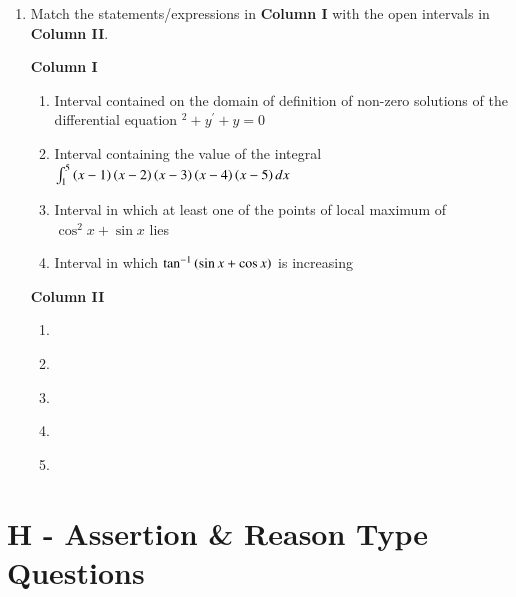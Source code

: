 \documentclass[journal]{IEEEtran}
\begin{document}
\begin{enumerate}

\item Match the statements/expressions in \textbf{Column I} with the open intervals in \textbf{Column II}.
	\hfill{}

	\begin{minipage}[t]{0.5\textwidth}
		\textbf{Column I}
		\begin{enumerate}[label=\brak{\Alph*}]
	\item Interval contained on the domain of definition of non-zero solutions of the differential equation $^2+y^{\prime}+y=0$
	\item Interval containing the value of the integral \\$\int_1^5 \left(x-1\right)\left(x-2\right)\left(x-3\right)\left(x-4\right)\left(x-5\right)dx$
	\item Interval in which at least one of the points of local maximum of $\cos^2 x +\sin x$ lies
	\item Interval in which $\tan^{-1}\left(\sin x + \cos x\right)$ is increasing 
	\end{enumerate}
	\end{minipage}
		\begin{minipage}[t]{0.5\textwidth}
			\textbf{Column II}
			\begin{enumerate}[label=\brak{\alph*}]\addtocounter{enumi}{15}
			\item {} \\
			\item {} \\
			\item {} \\
			\item {} \\
			\item \brak{-\pi, \pi} \\
	\end{enumerate}
	\end{minipage}
\end{enumerate}

\section{H - Assertion \& Reason Type Questions}
\end{document}
